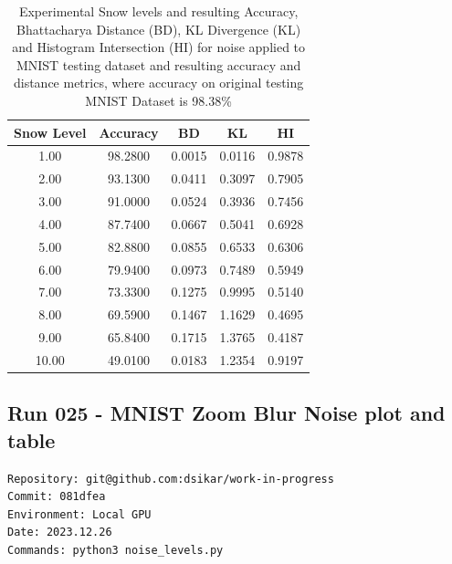 \begin{table}[ht]
\centering
\begin{tabular}{|c|c|c|c|c|}
\hline
Snow Level & Accuracy & BD & KL & HI \\
\hline

1.00 & 98.2800 & 0.0015 & 0.0116 & 0.9878 \\
2.00 & 93.1300 & 0.0411 & 0.3097 & 0.7905 \\
3.00 & 91.0000 & 0.0524 & 0.3936 & 0.7456 \\
4.00 & 87.7400 & 0.0667 & 0.5041 & 0.6928 \\
5.00 & 82.8800 & 0.0855 & 0.6533 & 0.6306 \\
6.00 & 79.9400 & 0.0973 & 0.7489 & 0.5949 \\
7.00 & 73.3300 & 0.1275 & 0.9995 & 0.5140 \\
8.00 & 69.5900 & 0.1467 & 1.1629 & 0.4695 \\
9.00 & 65.8400 & 0.1715 & 1.3765 & 0.4187 \\
10.00 & 49.0100 & 0.0183 & 1.2354 & 0.9197 \\

\hline
\end{tabular}
\caption{Experimental Snow levels and resulting Accuracy, Bhattacharya Distance (BD), KL Divergence (KL) and Histogram Intersection (HI) for noise applied to MNIST testing dataset and resulting accuracy and distance metrics, where accuracy on original testing MNIST Dataset is 98.38\%}
\label{tbl-snow-levels}
\end{table}

\subsection{Run 025 - MNIST Zoom Blur Noise plot and table}
\label{app_res:025}
\begin{verbatim}
Repository: git@github.com:dsikar/work-in-progress
Commit: 081dfea
Environment: Local GPU
Date: 2023.12.26
Commands: python3 noise_levels.py
\end{verbatim}


